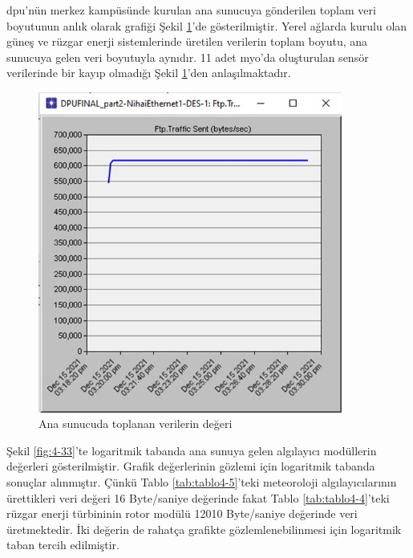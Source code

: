 \gls{dpu}'nün merkez kampüsünde kurulan ana sunucuya gönderilen toplam veri boyutunun anlık olarak grafiği Şekil \ref{fig:4-32}’de gösterilmiştir. Yerel ağlarda kurulu olan güneş ve rüzgar enerji sistemlerinde üretilen verilerin toplam boyutu, ana sunucuya gelen veri boyutuyla aynıdır. 11 adet \gls{myo}'da oluşturulan sensör verilerinde bir kayıp olmadığı Şekil \ref{fig:4-32}'den anlaşılmaktadır.

\begin{figure}[htbp]
\centerline{\includegraphics[width=10cm]{Resim/Sekil4-31.jpg}}
\caption{Ana sunucuda toplanan verilerin değeri}
\label{fig:4-32}
\end{figure}


Şekil \ref{fig:4-33}’te logaritmik tabanda ana sunuya gelen algılayıcı modüllerin değerleri gösterilmiştir. Grafik değerlerinin gözlemi için logaritmik tabanda sonuçlar alınmıştır. Çünkü Tablo \ref{tab:tablo4-5}’teki meteoroloji algılayıcılarının ürettikleri veri değeri 16 Byte/saniye değerinde fakat Tablo \ref{tab:tablo4-4}’teki rüzgar enerji türbininin rotor modülü 12010 Byte/saniye değerinde veri üretmektedir. İki değerin de rahatça grafikte gözlemlenebilinmesi için logaritmik taban tercih edilmiştir.

